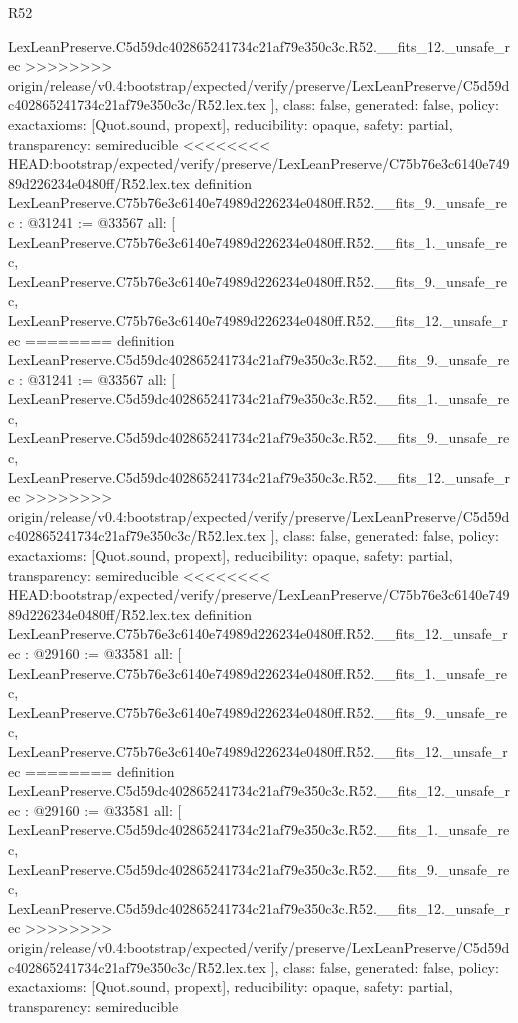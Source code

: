 \begin{lexlean}{R52}
\begin{coremodule}
{{{{{{{{{{{{{{{{{{{{{{{{{{{{{{{{{{{{{{{{{{{{{{{{{{{{{{{{{{{{{{{{{{{{{{{{{{{{{{{{{{{{{{{{{{{{{{{{{{{{{{{{{{{{{{{{{{{{{{{{{{{{{{{{{{{{{{{{{{{{{{{{{{{{{{{{{{{{    LexLeanPreserve.C5d59dc402865241734c21af79e350c3c.R52.__fits_12._unsafe_rec
>>>>>>>> origin/release/v0.4:bootstrap/expected/verify/preserve/LexLeanPreserve/C5d59dc402865241734c21af79e350c3c/R52.lex.tex
  ],
  class: false,
  generated: false,
  policy: exact{axioms: [Quot.sound, propext]},
  reducibility: opaque{},
  safety: partial,
  transparency: semireducible
}
<<<<<<<< HEAD:bootstrap/expected/verify/preserve/LexLeanPreserve/C75b76e3c6140e74989d226234e0480ff/R52.lex.tex
definition LexLeanPreserve.C75b76e3c6140e74989d226234e0480ff.R52.__fits_9._unsafe_rec : @31241 := @33567 {
  all: [
    LexLeanPreserve.C75b76e3c6140e74989d226234e0480ff.R52.__fits_1._unsafe_rec,
    LexLeanPreserve.C75b76e3c6140e74989d226234e0480ff.R52.__fits_9._unsafe_rec,
    LexLeanPreserve.C75b76e3c6140e74989d226234e0480ff.R52.__fits_12._unsafe_rec
========
definition LexLeanPreserve.C5d59dc402865241734c21af79e350c3c.R52.__fits_9._unsafe_rec : @31241 := @33567 {
  all: [
    LexLeanPreserve.C5d59dc402865241734c21af79e350c3c.R52.__fits_1._unsafe_rec,
    LexLeanPreserve.C5d59dc402865241734c21af79e350c3c.R52.__fits_9._unsafe_rec,
    LexLeanPreserve.C5d59dc402865241734c21af79e350c3c.R52.__fits_12._unsafe_rec
>>>>>>>> origin/release/v0.4:bootstrap/expected/verify/preserve/LexLeanPreserve/C5d59dc402865241734c21af79e350c3c/R52.lex.tex
  ],
  class: false,
  generated: false,
  policy: exact{axioms: [Quot.sound, propext]},
  reducibility: opaque{},
  safety: partial,
  transparency: semireducible
}
<<<<<<<< HEAD:bootstrap/expected/verify/preserve/LexLeanPreserve/C75b76e3c6140e74989d226234e0480ff/R52.lex.tex
definition LexLeanPreserve.C75b76e3c6140e74989d226234e0480ff.R52.__fits_12._unsafe_rec : @29160 := @33581 {
  all: [
    LexLeanPreserve.C75b76e3c6140e74989d226234e0480ff.R52.__fits_1._unsafe_rec,
    LexLeanPreserve.C75b76e3c6140e74989d226234e0480ff.R52.__fits_9._unsafe_rec,
    LexLeanPreserve.C75b76e3c6140e74989d226234e0480ff.R52.__fits_12._unsafe_rec
========
definition LexLeanPreserve.C5d59dc402865241734c21af79e350c3c.R52.__fits_12._unsafe_rec : @29160 := @33581 {
  all: [
    LexLeanPreserve.C5d59dc402865241734c21af79e350c3c.R52.__fits_1._unsafe_rec,
    LexLeanPreserve.C5d59dc402865241734c21af79e350c3c.R52.__fits_9._unsafe_rec,
    LexLeanPreserve.C5d59dc402865241734c21af79e350c3c.R52.__fits_12._unsafe_rec
>>>>>>>> origin/release/v0.4:bootstrap/expected/verify/preserve/LexLeanPreserve/C5d59dc402865241734c21af79e350c3c/R52.lex.tex
  ],
  class: false,
  generated: false,
  policy: exact{axioms: [Quot.sound, propext]},
  reducibility: opaque{},
  safety: partial,
  transparency: semireducible
}}}}}}}}}}}}}}}}}}}}}}}}}}}}}}}}}}}}}}}}}}}}}}}}}}}}}}}}}}}}}}}}}}}}}}}}}}}}}}}}}}}}}}}}}}}}}}}}}}}}}}}}}}}}}}}}}}}}}}}}}}}}}}}}}}}}}}}}}}}}}}}}}}}}}}}}}}}}}}
\end{coremodule}
\end{lexlean}

